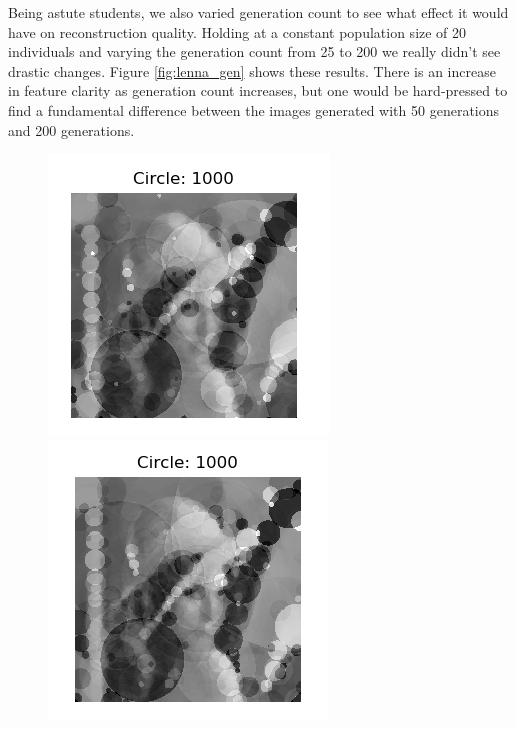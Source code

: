 \documentclass[12pt]{article}
\begin{document}
Being astute students, we also varied generation count to see what effect it would have on reconstruction quality. Holding at a constant population size of 20 individuals and varying the generation count from 25 to 200 we really didn't see drastic changes. Figure \ref{fig:lenna_gen} shows these results. There is an increase in feature clarity as generation count increases, but one would be hard-pressed to find a fundamental difference between the images generated with 50 generations and 200 generations. 
\begin{figure}[H]
\centering
\noindent\includegraphics[width=\textwidth/6]{../results/lenna/lenna_gen25}
\noindent\includegraphics[width=\textwidth/6]{../results/lenna/lenna_gen50}

\end{figure}
\end{document}
